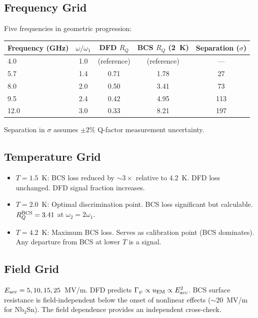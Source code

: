 \documentclass[11pt]{article}
\begin{document}
\subsection{Frequency Grid}

Five frequencies in geometric progression:
\begin{center}
\begin{tabular}{@{}lcccc@{}}
\toprule
\textbf{Frequency (GHz)} & \textbf{$\omega/\omega_1$} &
  \textbf{DFD $R_Q$} & \textbf{BCS $R_Q$ (2~K)} &
  \textbf{Separation ($\sigma$)} \\
\midrule
4.0 & 1.0 & (reference) & (reference) & --- \\
5.7 & 1.4 & 0.71 & 1.78 & 27 \\
8.0 & 2.0 & 0.50 & 3.41 & 73 \\
9.5 & 2.4 & 0.42 & 4.95 & 113 \\
12.0 & 3.0 & 0.33 & 8.21 & 197 \\
\bottomrule
\end{tabular}
\end{center}

Separation in $\sigma$ assumes $\pm 2\%$ Q-factor measurement
uncertainty.

\subsection{Temperature Grid}

\begin{itemize}[nosep]
\item $T = 1.5$~K: BCS loss reduced by $\sim 3\times$ relative to
  4.2~K. DFD loss unchanged. DFD signal fraction increases.
\item $T = 2.0$~K: Optimal discrimination point. BCS loss significant
  but calculable. $R_Q^{\rm BCS} = 3.41$ at $\omega_2 = 2\omega_1$.
\item $T = 4.2$~K: Maximum BCS loss. Serves as calibration point
  (BCS dominates). Any departure from BCS at lower $T$ is a signal.
\end{itemize}

\subsection{Field Grid}

$E_{\rm acc} = 5, 10, 15, 25$~MV/m. DFD predicts $\Gamma_\psi
\propto u_{\rm EM} \propto E_{\rm acc}^2$. BCS surface resistance is
field-independent below the onset of nonlinear effects ($\sim 20$~MV/m
for Nb$_3$Sn). The field dependence provides an independent cross-check.
\end{document}
